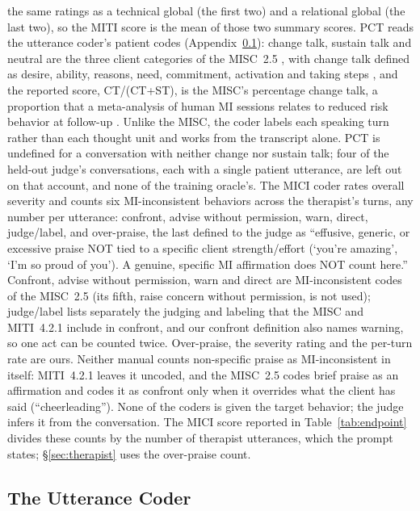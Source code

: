 the same ratings as a technical global (the first two) and a relational global (the last two), so
the MITI score is the mean of those two summary scores. PCT reads the
utterance coder's patient codes (Appendix~\ref{app:coder}): change talk, sustain talk and neutral
are the three client categories of the MISC~2.5 \citep{houck2010misc}, with change talk defined as
desire, ability, reasons, need, commitment, activation and taking steps \citep{miller2013mi}, and
the reported score, CT/(CT+ST), is the MISC's percentage change talk, a proportion that a
meta-analysis of human MI sessions relates to reduced risk behavior at follow-up
\citep{magill2018meta}. Unlike the MISC, the coder labels each speaking turn rather than each
thought unit and works from the transcript alone. PCT is undefined for a conversation with neither
change nor sustain talk; four of the held-out judge's conversations, each with a single patient
utterance, are left out on that account, and none of the training oracle's. The MICI coder rates overall severity and counts six MI-inconsistent behaviors
across the therapist's turns, any number per utterance: confront, advise without permission, warn,
direct, judge/label, and over-praise, the last defined to the judge as ``effusive, generic, or
excessive praise NOT tied to a specific client strength/effort (`you're amazing', `I'm so proud of
you'). A genuine, specific MI affirmation does NOT count here.'' Confront, advise without
permission, warn and direct are MI-inconsistent codes of the MISC~2.5 \citep{houck2010misc} (its
fifth, raise concern without permission, is not used); judge/label lists separately the judging
and labeling that the MISC and MITI~4.2.1 include in confront, and our confront definition also
names warning, so one act can be counted twice. Over-praise, the severity rating and the per-turn
rate are ours. Neither manual counts non-specific praise as MI-inconsistent in itself: MITI~4.2.1
leaves it uncoded, and the MISC~2.5 codes brief praise as an affirmation and codes it as confront
only when it overrides what the client has said (``cheerleading''). None of the coders is
given the target behavior; the judge infers it from the conversation. The MICI score reported in
Table~\ref{tab:endpoint} divides these counts by the number of therapist utterances, which the
prompt states; \S\ref{sec:therapist} uses the over-praise count.

\subsection{The Utterance Coder}
\label{app:coder}

